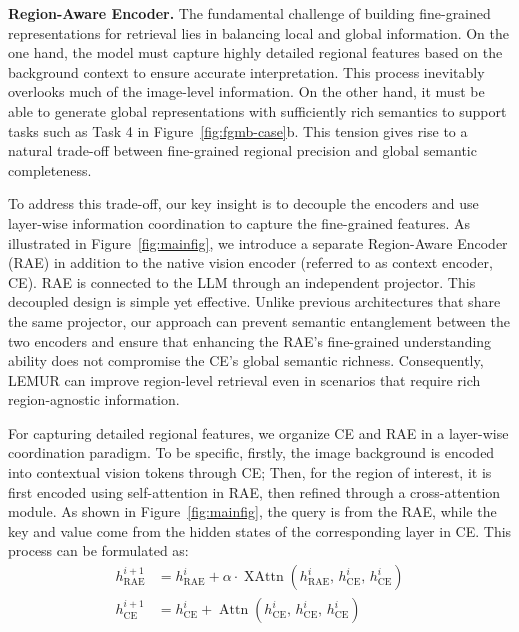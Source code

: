 
\textbf{Region-Aware Encoder.} The fundamental challenge of building fine-grained representations for retrieval lies in balancing local and global information. On the one hand, the model must capture highly detailed regional features based on the background context to ensure accurate interpretation. This process inevitably overlooks much of the image-level information. On the other hand, it must be able to generate global representations with sufficiently rich semantics to support tasks such as Task 4 in Figure~\ref{fig:fgmb-case}b.  This tension gives rise to a natural trade-off between fine-grained regional precision and global semantic completeness.

To address this trade-off, our key insight is to decouple the encoders and use layer-wise information coordination to capture the fine-grained features. As illustrated in Figure~\ref{fig:mainfig}, we introduce a separate Region-Aware Encoder (RAE) in addition to the native vision encoder (referred to as context encoder, CE). RAE is connected to the LLM through an independent projector. This decoupled design is simple yet effective. Unlike previous architectures that share the same projector\citep{lian2025dam,lin2025pam}, our approach can prevent semantic entanglement between the two encoders and ensure that enhancing the RAE's fine-grained understanding ability does not compromise the CE’s global semantic richness. Consequently, LEMUR can improve region-level retrieval even in scenarios that require rich region-agnostic information.

For capturing detailed regional features, we organize CE and RAE in a layer-wise coordination paradigm. To be specific, firstly, the image background is encoded into contextual vision tokens through CE; Then, for the region of interest, it is first encoded using self-attention in RAE, then refined through a cross-attention module. As shown in Figure~\ref{fig:mainfig}, the query is from the RAE, while the key and value come from the hidden states of the corresponding layer in CE. This process can be formulated as:
\begin{align}
h_{\mathrm{RAE}}^{i+1} &= h_{\mathrm{RAE}}^{i} + \alpha \cdot \operatorname{XAttn}\!\left(h_{\mathrm{RAE}}^{i},\, h_{\mathrm{CE}}^{i},\, h_{\mathrm{CE}}^{i}\right)\\
h_{\mathrm{CE}}^{i+1}  &= h_{\mathrm{CE}}^{i} + \operatorname{Attn}\!\left(h_{\mathrm{CE}}^{i},\, h_{\mathrm{CE}}^{i},\, h_{\mathrm{CE}}^{i}\right)
\end{align}

